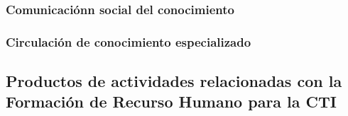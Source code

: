 \subsubsection{Comunicaci\'onn social del conocimiento}

\subsubsection{Circulaci\'on de conocimiento especializado}


\subsection{Productos de actividades relacionadas con la Formación de Recurso
Humano para la CTI }



